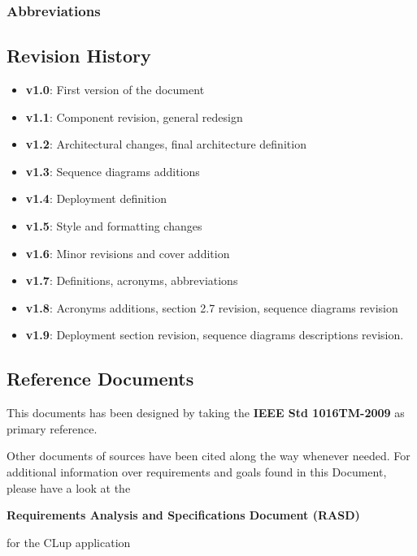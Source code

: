 \subsubsection{Abbreviations}
\subsection{Revision History}
\begin{itemize}
	\item \textbf{v1.0}: First version of the document
	\item \textbf{v1.1}: Component revision, general redesign
	\item \textbf{v1.2}: Architectural changes, final architecture definition
	\item \textbf{v1.3}: Sequence diagrams additions
	\item \textbf{v1.4}: Deployment definition
	\item \textbf{v1.5}: Style and formatting changes
	\item \textbf{v1.6}: Minor revisions and cover addition
	\item \textbf{v1.7}: Definitions, acronyms, abbreviations
	\item \textbf{v1.8}: Acronyms additions, section 2.7 revision, sequence diagrams revision
	\item \textbf{v1.9}: Deployment section revision, sequence diagrams descriptions revision.
	
	
\end{itemize}

\subsection{Reference Documents}
This documents has been designed by taking the \textbf{IEEE Std 1016TM-2009} as primary reference.\cite{STANDARD}\newline


\noindent Other documents of sources have been cited along the way whenever needed.\newline
For additional information over requirements and goals found in this Document, please have a look at the \begin{large}\textbf{Requirements Analysis and Specifications Document (RASD)}                                                                                                                                                                         \end{large} for the CLup application
